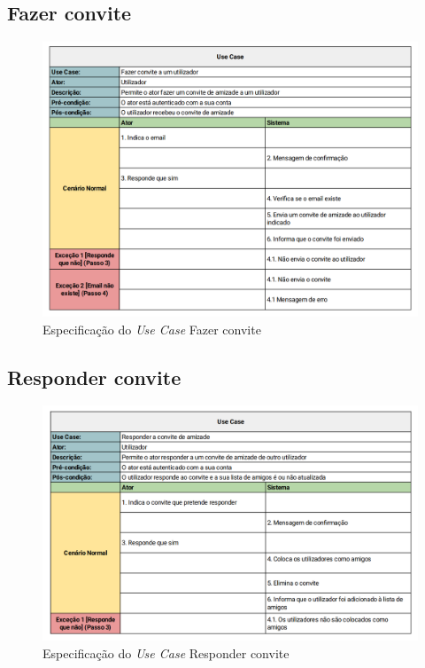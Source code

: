\documentclass[a4paper]{report}
\begin{document}
\subsection{Fazer convite}

\begin{figure}[H]
	\centering 
    \includegraphics[width=\textwidth]{images/Adicionar_Amigo.png}  
    \caption{Especificação do \emph{Use Case} Fazer convite}
\end{figure}

\subsection{Responder convite}

\begin{figure}[H]
	\centering 
    \includegraphics[width=\textwidth]{images/Responder_Convite.png}  
    \caption{Especificação do \emph{Use Case} Responder convite}
\end{figure}
\end{document}
